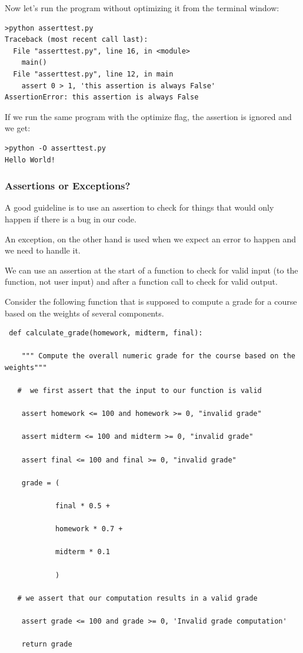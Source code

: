 \documentclass{article}
\begin{document}
Now let's run the program without optimizing it from the terminal window:

\begin{lstlisting}
>python asserttest.py
Traceback (most recent call last):
  File "asserttest.py", line 16, in <module>
    main()
  File "asserttest.py", line 12, in main
    assert 0 > 1, 'this assertion is always False'
AssertionError: this assertion is always False
\end{lstlisting}

If we run the same program with the optimize flag, the assertion is ignored and we get:

\begin{lstlisting}
>python -O asserttest.py
Hello World!
\end{lstlisting}
 
\subsubsection{Assertions or Exceptions?}
A good guideline is to use an assertion to check for things that would only happen if there is a bug in our code.

An exception, on the other hand is used when we expect an error to happen and we need to handle it.

We can use an assertion at the start of a function to check for valid input (to the function, not user input) and after a function call to check for valid output.

Consider the following function that is supposed to compute a grade for a course based on the weights of several components.

\begin{lstlisting}
 def calculate_grade(homework, midterm, final):

    """ Compute the overall numeric grade for the course based on the weights"""

   #  we first assert that the input to our function is valid

    assert homework <= 100 and homework >= 0, "invalid grade"

    assert midterm <= 100 and midterm >= 0, "invalid grade"

    assert final <= 100 and final >= 0, "invalid grade"

    grade = (

            final * 0.5 +

            homework * 0.7 +

            midterm * 0.1

            )

   # we assert that our computation results in a valid grade

    assert grade <= 100 and grade >= 0, 'Invalid grade computation'

    return grade
\end{lstlisting}
\end{document}
